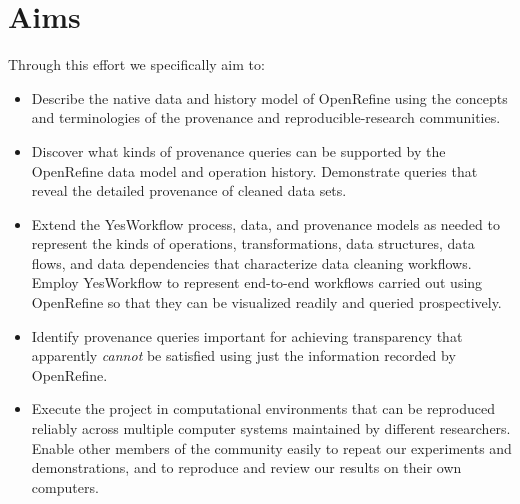 \section{Aims}

Through this effort we specifically aim to:

\begin{itemize}[label=\raisebox{0.25ex}{\tiny$\bullet$}]

\item Describe the native data and history model of OpenRefine using the concepts and terminologies of the provenance and reproducible-research communities.

\item Discover what kinds of provenance queries can be supported by the OpenRefine data model and operation history.  Demonstrate queries that reveal the detailed provenance of cleaned data sets.

\item Extend the YesWorkflow process, data, and provenance models as needed to represent the kinds of operations, transformations, data structures, data flows, and data dependencies that characterize data cleaning workflows.  Employ YesWorkflow to represent end-to-end workflows carried out using OpenRefine so that they can be visualized readily and queried prospectively.

\item Identify provenance queries important for achieving transparency that apparently \emph{cannot} be satisfied using just the information recorded by OpenRefine.

\item Execute the project in computational environments that can be reproduced reliably across multiple computer systems maintained by different researchers.  Enable other members of the community easily to repeat our experiments and demonstrations, and to reproduce and review our results on their own computers.

\end{itemize}
